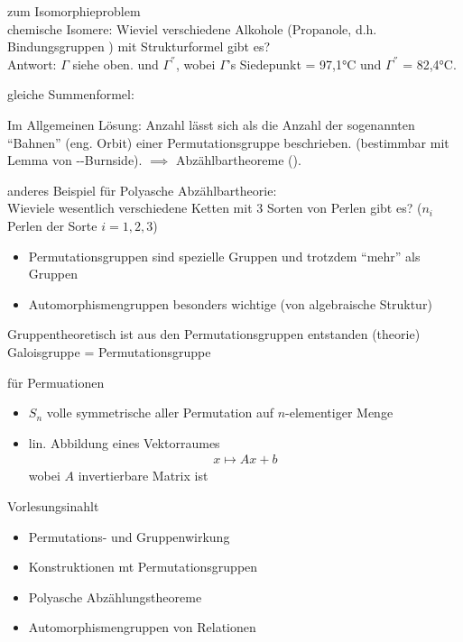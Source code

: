\begin{example}
	zum Isomorphieproblem\\
	chemische Isomere: Wieviel verschiedene Alkohole (Propanole, d.h. Bindungsgruppen ) mit Strukturformel  gibt es?\\
	Antwort: $\Gamma$ siehe oben. und
	$\Gamma^{''}$, wobei $\Gamma$'s Siedepunkt = 97,1°C und $\Gamma^{''}$ = 82,4°C.
\end{example}
\begin{remark}
	gleiche Summenformel:
\end{remark}
Im Allgemeinen Lösung: Anzahl lässt sich als die Anzahl der sogenannten ``Bahnen'' (eng. Orbit) einer Permutationsgruppe beschrieben. (bestimmbar mit Lemma von --Burnside). $\implies$ Abzählbartheoreme ().
\begin{example}
	anderes Beispiel für Polyasche Abzählbartheorie:\\
	Wieviele wesentlich verschiedene Ketten mit 3 Sorten von Perlen gibt es? ($n_i$ Perlen der Sorte $i = 1,2,3$)
\end{example}
\begin{itemize}
	\item Permutationsgruppen sind spezielle Gruppen und trotzdem ``mehr'' als Gruppen
	\item Automorphismengruppen besonders wichtige (von algebraische Struktur)
\end{itemize}
Gruppentheoretisch ist aus den Permutationsgruppen entstanden (theorie) Galoisgruppe = Permutationsgruppe
\begin{example}
	für Permuationen
	\begin{itemize}
		\item $S_n$ volle symmetrische aller Permutation auf $n$-elementiger Menge
		\item lin. Abbildung eines Vektorraumes
		\begin{align*}
			x \mapsto Ax + b
		\end{align*}
		wobei $A$ invertierbare Matrix ist
	\end{itemize}
\end{example}
Vorlesungsinahlt
\begin{itemize} 
	\item Permutations- und Gruppenwirkung
	\item Konstruktionen mt Permutationsgruppen
	\item Polyasche Abzählungstheoreme
	\item Automorphismengruppen von Relationen
\end{itemize}